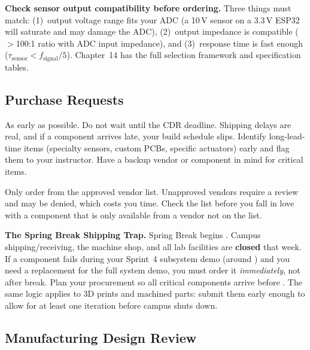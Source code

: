 \begin{tipbox}
\textbf{Check sensor output compatibility before ordering.} Three things must match: (1)~output voltage range fits your ADC (a 10\,V sensor on a 3.3\,V ESP32 will saturate and may damage the ADC), (2)~output impedance is compatible ($>$100:1 ratio with ADC input impedance), and (3)~response time is fast enough ($\tau_{\text{sensor}} < f_{\text{signal}}/5$). Chapter~14 has the full selection framework and specification tables.
\end{tipbox}

\subsection{Purchase Requests}

\begin{faqbox}
As early as possible. Do not wait until the CDR deadline. Shipping delays are real, and if a component arrives late, your build schedule slips. Identify long-lead-time items (specialty sensors, custom PCBs, specific actuators) early and flag them to your instructor. Have a backup vendor or component in mind for critical items.
\end{faqbox}

\begin{warnbox}
Only order from the approved vendor list. Unapproved vendors require a review and may be denied, which costs you time. Check the list before you fall in love with a component that is only available from a vendor not on the list.
\end{warnbox}

\begin{warnbox}
\textbf{The Spring Break Shipping Trap.} Spring Break begins \springbreakstart. Campus shipping/receiving, the machine shop, and all lab facilities are \textbf{closed} that week. If a component fails during your Sprint~4 subsystem demo (around \sprintfourdemos) and you need a replacement for the full system demo, you must order it \textit{immediately}, not after break. Plan your procurement so all critical components arrive before \springbreakorderby. The same logic applies to 3D prints and machined parts: submit them early enough to allow for at least one iteration before campus shuts down.
\end{warnbox}

\subsection{Manufacturing Design Review}

